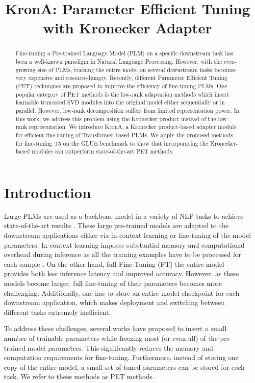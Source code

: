 \title{KronA: Parameter Efficient Tuning with Kronecker Adapter}

\begin{abstract}
Fine-tuning a Pre-trained Language Model (PLM) on a specific downstream task has been a well-known paradigm in Natural Language Processing. However, with the ever-growing size of PLMs, training the entire model on several downstream tasks becomes very expensive and resource-hungry. Recently, different Parameter Efficient Tuning (PET) techniques are proposed to improve the efficiency of fine-tuning PLMs. One popular category of PET methods is the low-rank adaptation methods which insert learnable truncated SVD modules into the original model either sequentially or in parallel. However, low-rank decomposition suffers from limited representation power. In this work, we address this problem using the Kronecker product instead of the low-rank representation. We introduce KronA, a Kronecker product-based adapter module for efficient fine-tuning of Transformer-based PLMs. We apply the proposed methods for fine-tuning T5 on the GLUE benchmark to show that incorporating the Kronecker-based modules can outperform state-of-the-art PET methods.
\end{abstract}

\section{Introduction}
Large PLMs are used as a backbone model in a variety of NLP tasks to achieve state-of-the-art results \cite{devlin-etal-2019-bert,radford2019language}.  These large pre-trained models are adapted to the downstream applications either via in-context learning or fine-tuning of the model parameters. In-context learning imposes substantial memory and computational overhead during inference as all the training examples have to be processed for each sample \cite{liu2022few}. On the other hand, full Fine-Tuning (FT) the entire model provides both less inference latency and improved accuracy. However, as these models become larger, full fine-tuning of their parameters becomes more challenging. Additionally, one has to store an entire model checkpoint for each downstream application, which makes deployment and switching between different tasks extremely inefficient. 

To address these challenges, several works have proposed to insert a small number of trainable parameters while freezing most (or even all) of the pre-trained model parameters. This significantly reduces the memory and computation requirements for fine-tuning. Furthermore, instead of storing one copy of the entire model, a small set of tuned parameters can be stored for each task. We refer to these methods as PET methods. 

